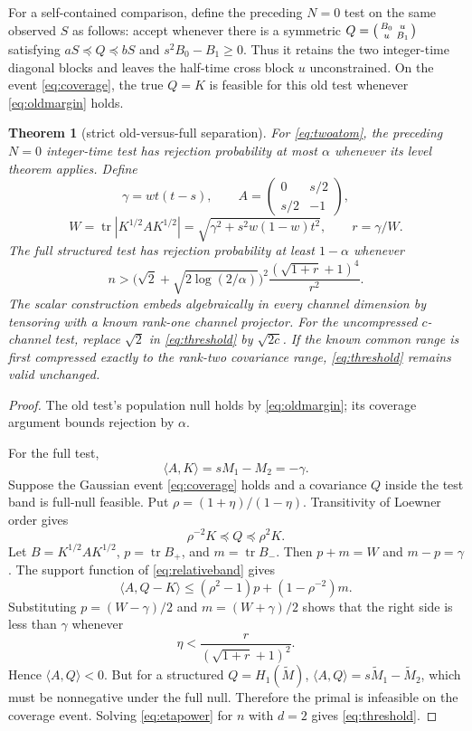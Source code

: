 \documentclass[11pt]{article}
\newtheorem{theorem}{Theorem}[section]
\newcommand{\tr}{\operatorname{tr}}
\newcommand{\ip}[2]{\langle #1,#2\rangle}
\begin{document}
For a self-contained comparison, define the preceding $N=0$ test on the
same observed $S$ as follows: accept whenever there is a symmetric
$Q=\begin{psmallmatrix}B_0&u\\u&B_1\end{psmallmatrix}$ satisfying
$aS\preceq Q\preceq bS$ and $s^2B_0-B_1\ge0$.  Thus it retains the two
integer-time diagonal blocks and leaves the half-time cross block $u$
unconstrained.  On the event \cref{eq:coverage}, the true $Q=K$ is feasible
for this old test whenever \cref{eq:oldmargin} holds.

\begin{theorem}[strict old-versus-full separation]\label{thm:strict}
For \cref{eq:twoatom}, the preceding $N=0$ integer-time test has rejection
probability at most $\alpha$ whenever its level theorem applies.  Define
\[
 \gamma=wt(t-s),\qquad
 A=\begin{pmatrix}0&s/2\\s/2&-1\end{pmatrix},                     \tag{5.5}
\]
\[
 W=\tr|K^{1/2}AK^{1/2}|
 =\sqrt{\gamma^2+s^2w(1-w)t^2},\qquad r=\gamma/W.                 \tag{5.6}
\]
The full structured test has rejection probability at least $1-\alpha$
whenever
\[
 \boxed{
 n>
 \bigl(\sqrt2+\sqrt{2\log(2/\alpha)}\bigr)^2
 \frac{(\sqrt{1+r}+1)^4}{r^2}.}                                   \tag{5.7}\label{eq:threshold}
\]
The scalar construction embeds algebraically in every channel dimension by
tensoring with a known rank-one channel projector.  For the uncompressed
$c$-channel test, replace $\sqrt2$ in \cref{eq:threshold} by $\sqrt{2c}$.
If the known common range is first compressed exactly to the rank-two
covariance range, \cref{eq:threshold} remains valid unchanged.
\end{theorem}

\begin{proof}
The old test's population null holds by \cref{eq:oldmargin}; its coverage
argument bounds rejection by $\alpha$.

For the full test,
\[
 \ip{A}{K}=sM_1-M_2=-\gamma.                                      \tag{5.8}
\]
Suppose the Gaussian event \cref{eq:coverage} holds and a covariance $Q$
inside the test band is full-null feasible.  Put
$\rho=(1+\eta)/(1-\eta)$.  Transitivity of Loewner order gives
\[
 \rho^{-2}K\preceq Q\preceq\rho^2K.                              \tag{5.9}\label{eq:relativeband}
\]
Let $B=K^{1/2}AK^{1/2}$, $p=\tr B_+$, and $m=\tr B_-$.  Then
$p+m=W$ and $m-p=\gamma$.  The support function of
\cref{eq:relativeband} gives
\[
 \ip{A}{Q-K}
 \le(\rho^2-1)p+(1-\rho^{-2})m.                                   \tag{5.10}
\]
Substituting $p=(W-\gamma)/2$ and $m=(W+\gamma)/2$ shows that the right
side is less than $\gamma$ whenever
\[
 \eta<\frac{r}{(\sqrt{1+r}+1)^2}.                                 \tag{5.11}\label{eq:etapower}
\]
Hence $\ip{A}{Q}<0$.  But for a structured
$Q=H_1(\widetilde M)$,
$\ip{A}{Q}=s\widetilde M_1-\widetilde M_2$, which must be
nonnegative under the full null.  Therefore the primal is infeasible on the
coverage event.  Solving \cref{eq:etapower} for $n$ with $d=2$ gives
\cref{eq:threshold}.
\end{proof}
\end{document}
